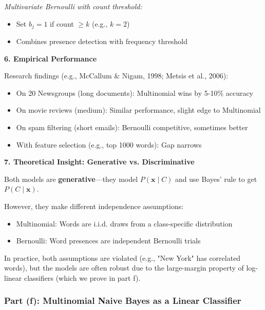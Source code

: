 \documentclass[12pt]{article}
\begin{document}
\begin{explanation}
\textit{Multivariate Bernoulli with count threshold:}
\begin{itemize}
    \item Set $b_j = 1$ if count $\geq k$ (e.g., $k=2$)
    \item Combines presence detection with frequency threshold
\end{itemize}

\textbf{6. Empirical Performance}

Research findings (e.g., McCallum \& Nigam, 1998; Metsis et al., 2006):
\begin{itemize}
    \item On 20 Newsgroups (long documents): Multinomial wins by 5-10\% accuracy
    \item On movie reviews (medium): Similar performance, slight edge to Multinomial
    \item On spam filtering (short emails): Bernoulli competitive, sometimes better
    \item With feature selection (e.g., top 1000 words): Gap narrows
\end{itemize}

\textbf{7. Theoretical Insight: Generative vs. Discriminative}

Both models are \textbf{generative}—they model $P(\mathbf{x} \mid C)$ and use Bayes' rule to get $P(C \mid \mathbf{x})$.

However, they make different independence assumptions:
\begin{itemize}
    \item Multinomial: Words are i.i.d. draws from a class-specific distribution
    \item Bernoulli: Word presences are independent Bernoulli trials
\end{itemize}

In practice, both assumptions are violated (e.g., "New York" has correlated words), but the models are often robust due to the large-margin property of log-linear classifiers (which we prove in part f).
\end{explanation}

\subsubsection{Part (f): Multinomial Naive Bayes as a Linear Classifier}
\end{document}
